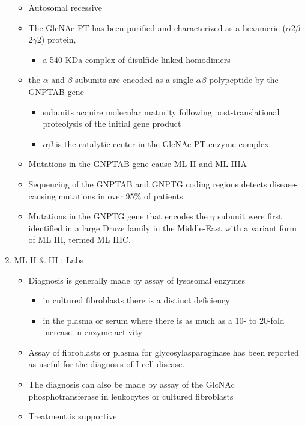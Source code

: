 \documentclass{scrartcl}
\begin{document}
\begin{enumerate}
\begin{itemize}
\item Autosomal recessive
\item The GlcNAc-PT has been purified and characterized as a hexameric
(\(\alpha\)2\(\beta\)2\(\gamma\)2) protein,
\begin{itemize}
\item a 540-KDa complex of disulfide linked homodimers
\end{itemize}
\item the \(\alpha\) and \(\beta\) subunits are encoded as a single \(\alpha \beta\) polypeptide by the GNPTAB gene
\begin{itemize}
\item subunits acquire molecular maturity following post-translational proteolysis of the initial gene product
\item \(\alpha \beta\) is the catalytic center in the GlcNAc-PT enzyme complex.
\end{itemize}
\item Mutations in the GNPTAB gene cause ML II and ML IIIA
\item Sequencing of the GNPTAB and GNPTG coding regions detects
disease-causing mutations in over 95\% of patients.
\item Mutations in the GNPTG gene that encodes the \(\gamma\) subunit were
first identified in a large Druze family in the Middle-East with a
variant form of ML III, termed ML IIIC.
\end{itemize}


\item ML II \& III : Labs
\label{sec:orgfc47cbc}

\begin{itemize}
\item Diagnosis is generally made by assay of lysosomal enzymes
\begin{itemize}
\item in cultured fibroblasts there is a distinct deficiency
\item in the plasma or serum where there is as much as a 10- to 20-fold increase in enzyme activity
\end{itemize}
\item Assay of fibroblasts or plasma for glycosylasparaginase has been
reported as useful for the diagnosis of I-cell disease.
\item The diagnosis can also be made by assay of the GlcNAc
phosphotransferase in leukocytes or cultured fibroblasts
\end{itemize}


\begin{itemize}
\item Treatment is supportive
\end{itemize}
\end{enumerate}
\end{document}
